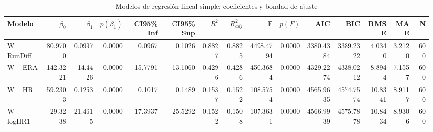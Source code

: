 \begin{table}
\caption{Modelos de regresión lineal simple: coeficientes y bondad de ajuste}
\label{tab:ols_simples}
\begin{tabular}{lrrrrrrrrrrrrrr}
\toprule
Modelo & $\beta_0$ & $\beta_1$ & $p(\beta_1)$ & CI95\% Inf & CI95\% Sup & $R^2$ & $R^2_{adj}$ & F & $p(F)$ & AIC & BIC & RMSE & MAE & N \\
\midrule
W ~ RunDiff & 80.9700 & 0.0997 & 0.0000 & 0.0967 & 0.1026 & 0.8827 & 0.8825 & 4498.4794 & 0.0000 & 3380.4384 & 3389.2322 & 4.0340 & 3.2120 & 600 \\
W ~ ERA & 142.3221 & -14.4426 & 0.0000 & -15.7791 & -13.1060 & 0.4296 & 0.4286 & 450.3684 & 0.0000 & 4329.2274 & 4338.0212 & 8.8944 & 7.1557 & 600 \\
W ~ HR & 59.2303 & 0.1253 & 0.0000 & 0.1017 & 0.1489 & 0.1537 & 0.1522 & 108.5754 & 0.0000 & 4565.9635 & 4574.7574 & 10.8341 & 8.9117 & 600 \\
W ~ logHR1 & -29.3238 & 21.4615 & 0.0000 & 17.3937 & 25.5292 & 0.1522 & 0.1508 & 107.3631 & 0.0000 & 4566.9939 & 4575.7878 & 10.8434 & 8.9306 & 600 \\
\bottomrule
\end{tabular}
\end{table}
